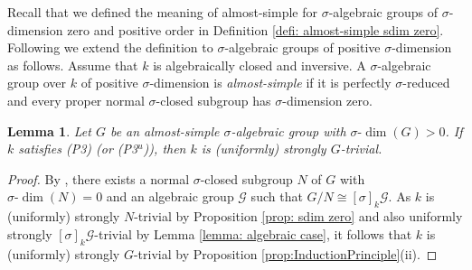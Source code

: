 \documentclass[oneside,reqno]{amsart}
\newtheorem{lemma}[theo]{Lemma}
\theoremstyle{definition}
\newcommand{\G}{\mathcal{G}}
\newcommand{\sdim}{\sigma\text{-}\dim}
\newcommand{\N}{\mathcal{N}}
\newcommand{\s}{\sigma}
\newcommand{\Gm}{\mathbb{G}_m}
\newcommand{\Ga}{\mathbb{G}_a}
\newcommand{\pt}{{\rm{(P3$^u$)}}}
\newcommand{\ptweak}{{\rm{(P3)}}}
\begin{document}
%
%
%
%
%
%
%	
%
%

Recall that we defined the meaning of almost-simple for $\s$-algebraic groups of $\s$-dimension zero and positive order in Definition \ref{defi: almost-simple sdim zero}. Following \cite[Def. 7.10]{Wibmer:almostsimple} we extend the definition to $\s$-algebraic groups of positive $\s$-dimension as follows. Assume that $k$ is algebraically closed and inversive. A $\s$-algebraic group over $k$ of positive $\s$-dimension is \emph{almost-simple} if it is perfectly $\s$-reduced and every proper normal $\s$-closed subgroup has $\s$-dimension zero.


\begin{lemma} \label{lemma: proof for almost simple pos dim}
	Let $G$ be an almost-simple $\s$-algebraic group with $\sdim(G)>0$. If $k$ satisfies \ptweak{} (or \pt{}), then $k$ is (uniformly) strongly $G$-trivial.
\end{lemma}
\begin{proof}
	 By \cite[Cor. 8.12]{Wibmer:almostsimple}, there exists a normal $\s$-closed subgroup $N$ of $G$ with $\sdim(N)=0$ and an algebraic group $\G$ such that $G/N\cong [\s]_k\G$. 
	As $k$ is (uniformly) strongly $N$-trivial by Proposition \ref{prop: sdim zero} and also uniformly strongly $[\s]_k\G$-trivial by Lemma \ref{lemma: algebraic case}, it follows that $k$ is (uniformly) strongly $G$-trivial by Proposition \ref{prop:InductionPrinciple}(ii).
\end{proof}
\end{document}
